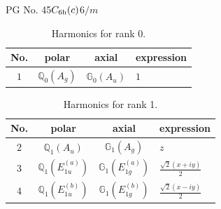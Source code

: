 \documentclass[fleqn,8pt,landscape]{jsarticle}
\begin{document}
\setcounter{MaxMatrixCols}{32}

\renewcommand{\tablename}{Table~}
\renewcommand{\figurename}{Figure~}
\begin{center}
\LARGE
PG No. 45\quad$C_{\rm 6h}(c)$\quad$6/m$\quad[ hexagonal ]
\end{center}
\begin{table}[ht!]
\begin{center}
\caption{Harmonics for rank 0.}
\renewcommand{\arraystretch}{1.3}
\begin{tabular}{cccl} \hline \hline
No. & polar & axial & expression \\ \hline
$ 1 $ & $ \mathbb{Q}_{0}(A_{g}) $ & $ \mathbb{G}_{0}(A_{u}) $ & $ 1 $ \\
 \hline \hline
\end{tabular}
\end{center}
\end{table}
\begin{table}[ht!]
\begin{center}
\caption{Harmonics for rank 1.}
\renewcommand{\arraystretch}{1.3}
\begin{tabular}{cccl} \hline \hline
No. & polar & axial & expression \\ \hline
$ 2 $ & $ \mathbb{Q}_{1}(A_{u}) $ & $ \mathbb{G}_{1}(A_{g}) $ & $ z $ \\
$ 3 $ & $ \mathbb{Q}_{1}(E_{1u}^{(a)}) $ & $ \mathbb{G}_{1}(E_{1g}^{(a)}) $ & $ \frac{\sqrt{2} \left(x + i y\right)}{2} $ \\
$ 4 $ & $ \mathbb{Q}_{1}(E_{1u}^{(b)}) $ & $ \mathbb{G}_{1}(E_{1g}^{(b)}) $ & $ \frac{\sqrt{2} \left(x - i y\right)}{2} $ \\
 \hline \hline
\end{tabular}
\end{center}
\end{table}
\end{document}
